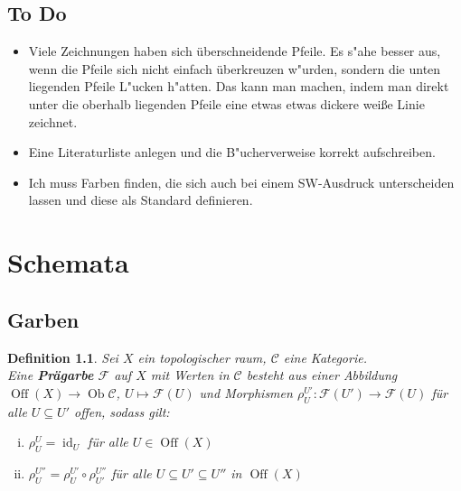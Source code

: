 \documentclass[paper = A4, fontsize=12pt, numbers=noendperiod, chapterprefix=true]{scrbook}
\theoremstyle{break}
\newtheorem{Def}{Definition}[section]
\theoremstyle{nonumberbreak}
\theoremstyle{nonumberplain}
\newcommand{\emp}[1]{\textbf{\emph{#1}}}
\newcommand{\deftermspec}[2]{{\index{#2}}\emp{#1}}
\DeclareMathOperator{\Ob}{Ob}
\DeclareMathOperator{\Off}{Off}
\DeclareMathOperator{\id}{id}
\begin{document}
\section*{To Do}\begin{itemize}
\item
  Viele Zeichnungen haben sich \"uberschneidende Pfeile. Es s"ahe besser aus, wenn die Pfeile sich nicht einfach \"uberkreuzen w"urden, sondern die unten liegenden Pfeile L"ucken h"atten. Das kann man machen, indem man direkt unter die oberhalb liegenden Pfeile eine etwas etwas dickere wei\ss e Linie zeichnet.
\item
	Eine Literaturliste anlegen und die B"ucherverweise korrekt aufschreiben.
\item
	Ich muss Farben finden, die sich auch bei einem SW-Ausdruck unterscheiden lassen und diese als Standard definieren.
\end{itemize}


\chapter{Schemata}

\section{Garben}

\begin{Def}
Sei $X$ ein topologischer raum, $\mathcal C$ eine Kategorie.\\
Eine \deftermspec{Pr\"agarbe}{Garbe!Pr\"a-} $\mathcal F$ auf $X$ mit Werten in $\mathcal C$ besteht aus einer Abbildung $\Off(X) \to \Ob \mathcal C$, $U \mapsto \mathcal F(U)$ und Morphismen $\rho_U^{U'}: \mathcal F(U') \to \mathcal F(U)$ f\"ur alle $U\subseteq U'$ offen, sodass gilt:
\begin{enumerate}[i)]
\item
  $\rho_U^U = \id_U$ f\"ur alle $U\in \Off(X)$
\item
  $\rho_U^{U''} = \rho_U^{U'} \circ \rho_{U'}^{U''}$ f\"ur alle $U\subseteq U' \subseteq U''$ in $\Off(X)$
\end{enumerate}\end{Def}
\end{document}
